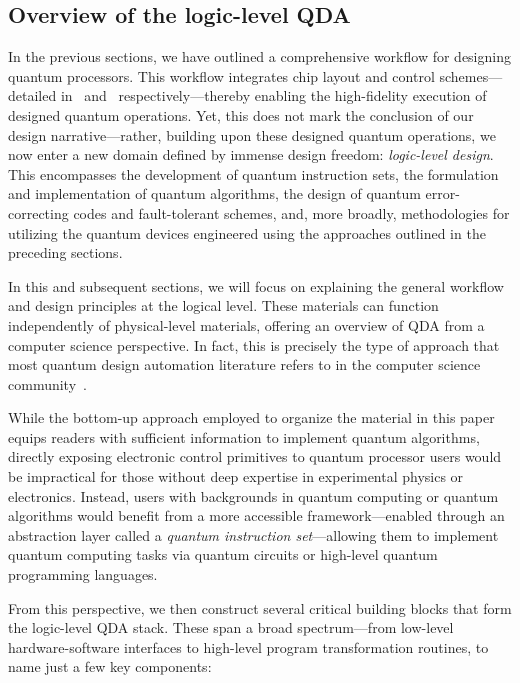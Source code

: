 \documentclass[a4paper,onecolumn,11pt,unpublished]{quantumarticle}
\begin{document}
\subsection{Overview of the logic-level QDA}
In the previous sections, we have outlined a comprehensive workflow for designing quantum processors. This workflow integrates chip layout and control schemes---detailed in~ and~ respectively---thereby enabling the high-fidelity execution of designed quantum operations. Yet, this does not mark the conclusion of our design narrative---rather, building upon these designed quantum operations, we now enter a new domain defined by immense design freedom: \textit{logic-level design}. This encompasses the development of quantum instruction sets, the formulation and implementation of quantum algorithms, the design of quantum error-correcting codes and fault-tolerant schemes, and, more broadly, methodologies for utilizing the quantum devices engineered using the approaches outlined in the preceding sections.

In this and subsequent sections, we will focus on explaining the general workflow and design principles at the logical level. These materials can function independently of physical-level materials, offering an overview of QDA from a computer science perspective. In fact, this is precisely the type of approach that most quantum design automation literature refers to in the computer science community~\cite{willeDesignAutomationQuantum2024}.

While the bottom-up approach employed to organize the material in this paper equips readers with sufficient information to implement quantum algorithms, directly exposing electronic control primitives to quantum processor users would be impractical for those without deep expertise in experimental physics or electronics. Instead, users with backgrounds in quantum computing or quantum algorithms would benefit from a more accessible framework---enabled through an abstraction layer called a \textit{quantum instruction set}---allowing them to implement quantum computing tasks via quantum circuits or high-level quantum programming languages.

From this perspective, we then construct several critical building blocks that form the logic-level QDA stack. These span a broad spectrum---from low-level hardware-software interfaces to high-level program transformation routines, to name just a few key components:
\end{document}
